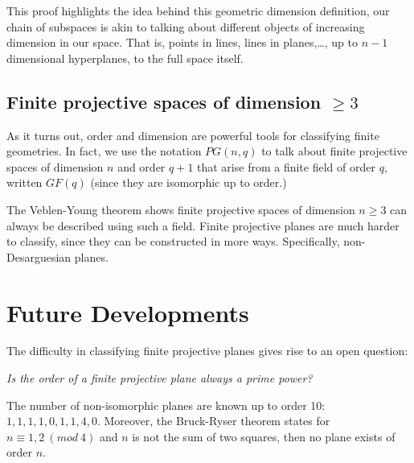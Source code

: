 \documentclass[12pt]{article}
\begin{document}
    This proof highlights the idea behind this geometric dimension definition,
    our chain of subspaces is akin to talking about different objects of increasing dimension in our space.
    That is, points in lines, lines in planes,\ldots, up to $n-1$ dimensional hyperplanes, to the full space itself.

    \subsection{Finite projective spaces of dimension $\geq 3$ }

    As it turns out, order and dimension are powerful tools for classifying finite geometries.
    In fact, we use the notation $PG(n, q)$ to talk about finite projective spaces of dimension $n$ and order $q+1$
    that arise from a finite field of order $q$, written $GF(q)$ (since they are isomorphic up to order.)

    The Veblen-Young theorem shows finite projective spaces of dimension $n \geq 3$ can always be described using such a field.
    Finite projective planes are much harder to classify, since they can be constructed in more ways.
    Specifically, non-Desarguesian planes.



    \section{Future Developments}

    The difficulty in classifying finite projective planes gives rise to an open question:

    \textit{Is the order of a finite projective plane always a prime power?}

    The number of non-isomorphic planes are known up to order 10: $1, 1, 1, 1, 0, 1, 1, 4, 0$.
    Moreover, the Bruck-Ryser theorem states for $n \equiv 1,2\ (mod\ 4)$ and $n$ is not the sum of two squares,
    then no plane exists of order $n$.\cite{https://oeis.org/A001231}


    
    
\end{document}
